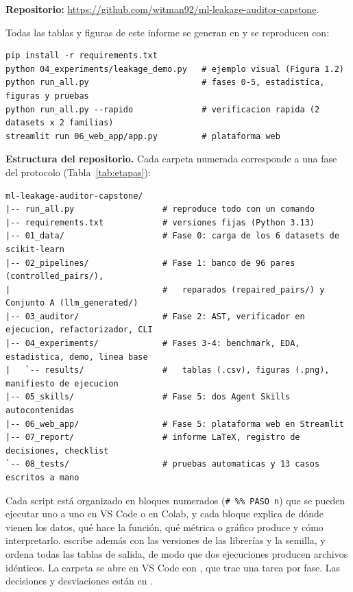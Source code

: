 
\label{an:repro}

\textbf{Repositorio:} \url{https://github.com/witman92/ml-leakage-auditor-capstone}.

Todas las tablas y figuras de este informe se generan en  y se reproducen con:

\begin{footnotesize}
\begin{verbatim}
pip install -r requirements.txt
python 04_experiments/leakage_demo.py   # ejemplo visual (Figura 1.2)
python run_all.py                       # fases 0-5, estadistica, figuras y pruebas
python run_all.py --rapido              # verificacion rapida (2 datasets x 2 familias)
streamlit run 06_web_app/app.py         # plataforma web
\end{verbatim}
\end{footnotesize}

\textbf{Estructura del repositorio.} Cada carpeta numerada corresponde a una fase del protocolo (Tabla~\ref{tab:etapas}):

\begin{footnotesize}
\begin{verbatim}
ml-leakage-auditor-capstone/
|-- run_all.py                  # reproduce todo con un comando
|-- requirements.txt            # versiones fijas (Python 3.13)
|-- 01_data/                    # Fase 0: carga de los 6 datasets de scikit-learn
|-- 02_pipelines/               # Fase 1: banco de 96 pares (controlled_pairs/),
|                               #   reparados (repaired_pairs/) y Conjunto A (llm_generated/)
|-- 03_auditor/                 # Fase 2: AST, verificador en ejecucion, refactorizador, CLI
|-- 04_experiments/             # Fases 3-4: benchmark, EDA, estadistica, demo, linea base
|   `-- results/                #   tablas (.csv), figuras (.png), manifiesto de ejecucion
|-- 05_skills/                  # Fase 5: dos Agent Skills autocontenidas
|-- 06_web_app/                 # Fase 5: plataforma web en Streamlit
|-- 07_report/                  # informe LaTeX, registro de decisiones, checklist
`-- 08_tests/                   # pruebas automaticas y 13 casos escritos a mano
\end{verbatim}
\end{footnotesize}

Cada script está organizado en bloques numerados (\texttt{\# \%\% PASO n}) que se pueden ejecutar uno a uno en VS Code o en Colab, y cada bloque explica de dónde vienen los datos, qué hace la función, qué métrica o gráfico produce y cómo interpretarlo.  escribe además  con las versiones de las librerías y la semilla, y ordena todas las tablas de salida, de modo que dos ejecuciones producen archivos idénticos. La carpeta se abre en VS Code con , que trae una tarea por fase. Las decisiones y desviaciones están en .

